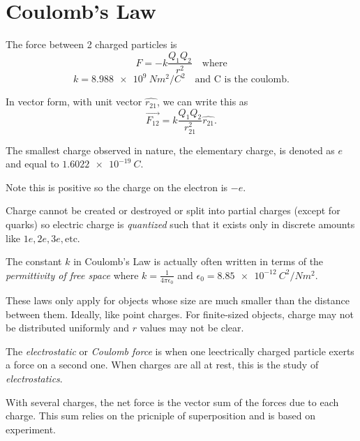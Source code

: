 \section{Coulomb's Law}

\begin{definition}
    The force between 2 charged particles is
    $$F = -k\frac{Q_1Q_2}{r^2} \quad \text{where}$$ $$k = \qty{8.988e9}{N m^2 / C^2} \quad \text{and C is the coulomb}.$$

    In vector form, with unit vector $\hat{r_{21}}$, we can write this as $$\vec{F_{12}} = k\frac{Q_1Q_2}{r^2_{21}}\hat{r_{21}}.$$
\end{definition}
\begin{definition}
    The smallest charge observed in nature, the elementary charge, is denoted as $e$ and equal to $\qty{1.6022e-19}{C}.$

    Note this is positive so the charge on the electron is $-e$.
\end{definition}
\begin{definition}[Quantized]
    Charge cannot be created or destroyed or split into partial charges (except for quarks) so electric charge is \emph{quantized} such that it exists only in discrete amounts like $1e, 2e, 3e, \text{etc}.$
\end{definition}
\begin{remark}
    The constant $k$ in Coulomb's Law is actually often written in terms of the \emph{permittivity of free space} where $k = \frac{1}{4\pi\epsilon_0}$ and $\epsilon_0 = \qty{8.85e-12}{C^2/N m^2}.$
\end{remark}
\begin{remark}
    These laws only apply for objects whose size are much smaller than the distance between them. Ideally, like point charges. For finite-sized objects, charge may not be distributed uniformly and $r$ values may not be clear.
\end{remark}
\begin{definition}
    The \emph{electrostatic} or \emph{Coulomb force} is when one leectrically charged particle exerts a force on a second one. When charges are all at rest, this is the study of \emph{electrostatics}.
\end{definition}
\begin{definition}
    With several charges, the net force is the vector sum of the forces due to each charge. This sum relies on the pricniple of superposition and is based on experiment.
\end{definition}

